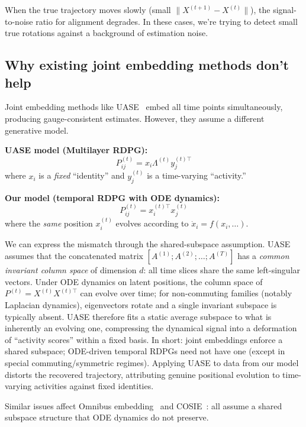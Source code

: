 \documentclass{article}
\theoremstyle{plain}
\theoremstyle{definition}
\theoremstyle{remark}
\begin{document}
When the true trajectory moves slowly (small $\|X^{(t+1)} - X^{(t)}\|$), the signal-to-noise ratio for alignment degrades. In these cases, we're trying to detect small true rotations against a background of estimation noise.

\subsection{Why existing joint embedding methods don't help}\label{sec:why-not-uase}

Joint embedding methods like UASE~\citep{gallagher2021spectral} embed all time points simultaneously, producing gauge-consistent estimates.
However, they assume a different generative model.

\textbf{UASE model (Multilayer RDPG):}
\begin{equation}
P^{(t)}_{ij} = x_i \Lambda^{(t)} y_j^{(t)\top}
\end{equation}
where $x_i$ is a \emph{fixed} ``identity'' and $y_j^{(t)}$ is a time-varying ``activity.''

\textbf{Our model (temporal RDPG with ODE dynamics):}
\begin{equation}
P^{(t)}_{ij} = x_i^{(t)\top} x_j^{(t)}
\end{equation}
where the \emph{same} position $x_i^{(t)}$ evolves according to $\dot{x}_i = f(x_i, \ldots)$.

We can express the mismatch through the shared-subspace assumption.
UASE assumes that the concatenated matrix $[A^{(1)}; A^{(2)}; \ldots; A^{(T)}]$ has a \emph{common invariant column space} of dimension $d$: all time slices share the same left-singular vectors.
Under ODE dynamics on latent positions, the column space of $P^{(t)} = X^{(t)} X^{(t)\top}$ can evolve over time; for non-commuting families (notably Laplacian dynamics), eigenvectors rotate and a single invariant subspace is typically absent.
UASE therefore fits a static average subspace to what is inherently an evolving one, compressing the dynamical signal into a deformation of ``activity scores'' within a fixed basis.
In short: joint embeddings enforce a shared subspace; ODE-driven temporal RDPGs need not have one (except in special commuting/symmetric regimes).
Applying UASE to data from our model distorts the recovered trajectory, attributing genuine positional evolution to time-varying activities against fixed identities.

Similar issues affect Omnibus embedding~\citep{levin2017central} and COSIE~\citep{arroyo2021inference}: all assume a shared subspace structure that ODE dynamics do not preserve.
\end{document}
